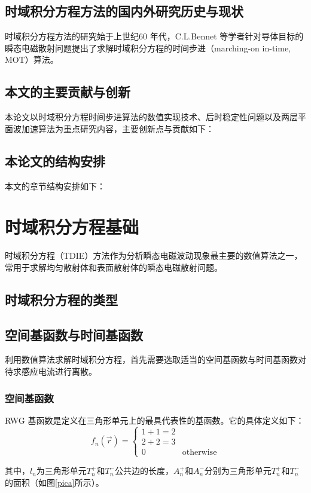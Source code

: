 \documentclass[master]{thesis-uestc}
\begin{document}
\section{时域积分方程方法的国内外研究历史与现状}
时域积分方程方法的研究始于上世纪60 年代，C.L.Bennet 等学者针对导体目标的瞬态电磁散射问题提出了求解时域积分方程的时间步进（marching-on in-time, MOT）算法。

\section{本文的主要贡献与创新}
本论文以时域积分方程时间步进算法的数值实现技术、后时稳定性问题以及两层平面波加速算法为重点研究内容，主要创新点与贡献如下：

\section{本论文的结构安排}
本文的章节结构安排如下：

\chapter{时域积分方程基础}
时域积分方程（TDIE）方法作为分析瞬态电磁波动现象最主要的数值算法之一，常用于求解均匀散射体和表面散射体的瞬态电磁散射问题。

\section{时域积分方程的类型}

\section{空间基函数与时间基函数}
利用数值算法求解时域积分方程，首先需要选取适当的空间基函数与时间基函数对待求感应电流进行离散。

\subsection{空间基函数}
RWG 基函数是定义在三角形单元上的最具代表性的基函数。它的具体定义如下：
\begin{equation}
f_n(\vec{r})=
\begin{cases}
1 + 1 = 2\\
2 + 2 = 3\\
0&\text{otherwise}
\end{cases}
\end{equation}

其中，$l_n$为三角形单元$T_n^+$和$T_n^-$公共边的长度，$A_n^+$和$A_n^-$分别为三角形单元$T_n^+$和$T_n^-$的面积（如图\ref{pica}所示）。
\end{document}
